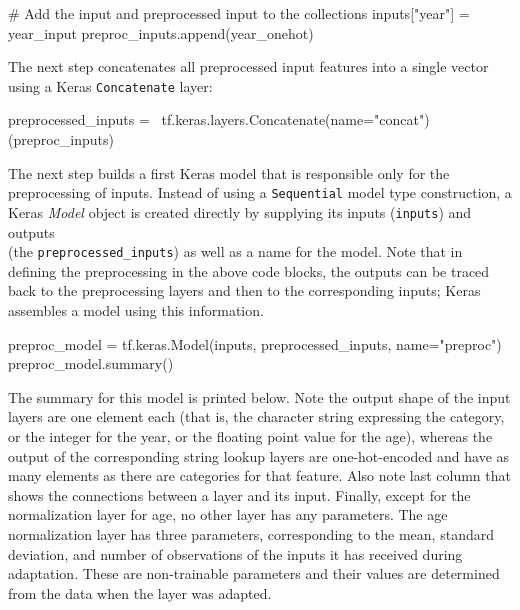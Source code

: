 \begin{withcode}
\begin{pythoncode}
# Add the input and preprocessed input to the collections
inputs["year"] = year_input
preproc_inputs.append(year_onehot)
\end{pythoncode}

The next step concatenates all preprocessed input features into a single vector using a Keras \texttt{Concatenate} layer:

\begin{pythoncode}
preprocessed_inputs = \
    tf.keras.layers.Concatenate(name="concat")(preproc_inputs)
\end{pythoncode}

The next step builds a first Keras model that is responsible only for the preprocessing of inputs. Instead of using a \texttt{Sequential} model type construction, a Keras \emph{Model} object is created directly by supplying its inputs (\texttt{inputs}) and outputs \\(the \texttt{preprocessed\_inputs}) as well as a name for the model. Note that in defining the preprocessing in the above code blocks, the outputs can be traced back to the preprocessing layers and then to the corresponding inputs; Keras assembles a model using this information.

\begin{pythoncode}
preproc_model = tf.keras.Model(inputs, 
                               preprocessed_inputs,
                               name="preproc")
preproc_model.summary()
\end{pythoncode}

The summary for this model is printed below. Note the output shape of the input layers are one element each (that is, the character string expressing the category, or the integer for the year, or the floating point value for the age), whereas the output of the corresponding string lookup layers are one-hot-encoded and have as many elements as there are categories for that feature. Also note last column that shows the connections between a layer and its input. Finally, except for the normalization layer for age, no other layer has any parameters. The age normalization layer has three parameters, corresponding to the mean, standard deviation, and number of observations of the inputs it has received during adaptation. These are non-trainable parameters and their values are determined from the data when the layer was adapted. 


\end{withcode}
